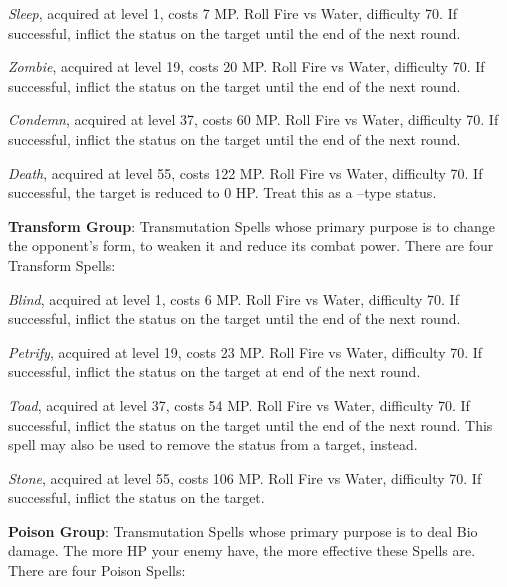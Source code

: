 \begin{multicols}{2}
    \textit{Sleep}, acquired at level 1, costs 7 MP\@. Roll Fire vs Water, difficulty 70. If successful, inflict the  status on the target until the end of the next round.
    
    \textit{Zombie}, acquired at level 19, costs 20 MP\@. Roll Fire vs Water, difficulty 70. If successful, inflict the  status on the target until the end of the next round.
    
    \textit{Condemn}, acquired at level 37, costs 60 MP\@. Roll Fire vs Water, difficulty 70. If successful, inflict the  status on the target until the end of the next round.
    
    \textit{Death}, acquired at level 55, costs 122 MP\@. Roll Fire vs Water, difficulty 70. If successful, the target is reduced to 0 HP\@. Treat this as a –type status.

    \ffcrystal[type=level,height=8pt]

    \textbf{Transform Group}: Transmutation Spells whose primary purpose is to change the opponent’s form, to weaken it and reduce its combat power. There are four Transform Spells:
    
    \textit{Blind}, acquired at level 1, costs 6 MP\@. Roll Fire vs Water, difficulty 70. If successful, inflict the  status on the target until the end of the next round.
    
    \textit{Petrify}, acquired at level 19, costs 23 MP\@. Roll Fire vs Water, difficulty 70. If successful, inflict the  status on the target at end of the next round.
    
    \textit{Toad}, acquired at level 37, costs 54 MP\@. Roll Fire vs Water, difficulty 70. If successful, inflict the  status on the target until the end of the next round. This spell may also be used to remove the  status from a target, instead.
    
    \textit{Stone}, acquired at level 55, costs 106 MP\@. Roll Fire vs Water, difficulty 70. If successful, inflict the  status on the target.

    \ffcrystal[type=level,height=8pt]

    \textbf{Poison Group}: Transmutation Spells whose primary purpose is to deal Bio damage. The more HP your enemy have, the more effective these Spells are. There are four Poison Spells:
    

\end{multicols}

